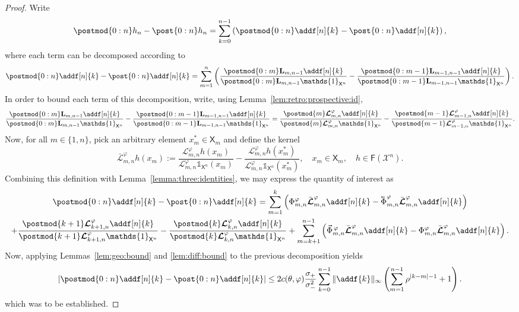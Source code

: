 \documentclass{article}
\newcommand{\retrokmodnorm}{\bar{\boldsymbol{\mathcal{L}}}^{\precpar}}
\newcommand{\xarb}{x^\ast}
\newcommand{\Xfd}{\mathcal{X}}
\newcommand{\cev}[1]{\reflectbox{\ensuremath{\vec{\reflectbox{\ensuremath{#1}}}}}}
\newcommand{\shiftbwd}{\cev{\shiftsymbol}^{\precpar}}
\newcommand{\shiftfwd}{\vec{\shiftsymbol}^{\, \precpar}}
\newcommand{\shiftsymbol}{\Phi}
\newcommand{\precpar}{\varphi}
\newcommand{\intvect}[2]{\{ #1, #2 \}}
\newcommand{\noshift}{\shiftsymbol^{\precpar}}
\newcommand{\udlow}{\sigma_-}
\newcommand{\udup}{\sigma_+}
\newcommand{\1}{\mathbbm{1}}
\newcommand{\retrokmod}{\boldsymbol{\mathcal{L}}^\precpar}
\newcommand{\uk}[1]{\mathbf{L}_{#1}}
\newcommand{\Xset}{\mathsf{X}}
\newcommand{\bmf}[1]{\set{F}(#1)}
\newcommand{\set}[1]{\mathsf{#1}}
\def\1{\mathds{1}}
\newcommand{\eqdef}{\ensuremath{:=}}
\begin{document}
\begin{proof}
Write 
$$
\postmod{0:n} h_n - \post{0:n} h_n = \sum_{k = 0}^{n - 1} \left( \postmod{0:n} \addf[n]{k} - \post{0:n} \addf[n]{k} \right), 
$$
where each term can be decomposed according to   
\begin{equation*}
\postmod{0:n} \addf[n]{k} - \post{0:n} \addf[n]{k} = 
\sum_{m = 1}^n \left( \frac{\postmod{0:m} \uk{m, n - 1} \addf[n]{k}}{\postmod{0:m} \uk{m, n - 1} \1_{\Xset^n}} - \frac{\postmod{0:m - 1} \uk{m - 1, n - 1} \addf[n]{k}}{\postmod{0:m - 1} \uk{m - 1, n - 1} \1_{\Xset^n}} \right).  
\end{equation*}
In order to bound each term of this decomposition, write, using Lemma~\ref{lem:retro:prospective:id},  
$$
\frac{\postmod{0:m} \uk{m, n - 1} \addf[n]{k}}{\postmod{0:m} \uk{m, n - 1} \1_{\Xset^n}} - \frac{\postmod{0:m - 1} \uk{m - 1, n - 1} \addf[n]{k}}{\postmod{0:m - 1} \uk{m - 1, n - 1} \1_{\Xset^n}} 
= \frac{\postmod{m} \retrokmod_{m, n} \addf[n]{k}}{\postmod{m} \retrokmod_{m, n} \1_{\Xset^n}} - \frac{\postmod{m - 1} \retrokmod_{m - 1, n} \addf[n]{k}}{\postmod{m - 1} \retrokmod_{m - 1, n} \1_{\Xset^n}}. 
$$
Now, for all $m \in \intvect{1}{n}$, pick an arbitrary element $\xarb_m \in \Xset_m$ and define the kernel 
\begin{equation} \label{eq:def:norm:objective:func}
\retrokmodnorm_{m, n} h(x_m) \eqdef \frac{\retrokmod_{m, n} h(x_m)}{\retrokmod_{m, n} \1_{\Xset^n}(x_m)} - \frac{\retrokmod_{m, n} h (\xarb_m)}{\retrokmod_{m, n} \1_{\Xset^n} (\xarb_m)}, \quad x_m \in \Xset_m, \quad h \in \bmf{\Xfd^n}. 
\end{equation}
Combining this definition with Lemma~\ref{lemma:three:identities}, we may express the quantity of interest as 
\begin{multline*}
\postmod{0:n} \addf[n]{k} - \post{0:n} \addf[n]{k} = \sum_{m = 1}^k \left( \noshift_{m, n} \retrokmodnorm_{m, n} \addf[n]{k} - \shiftbwd_{m, n}  \retrokmodnorm_{m, n} \addf[n]{k} \right) \\ 
+ \frac{\postmod{k + 1} \retrokmod_{k + 1, n} \addf[n]{k}}{\postmod{k + 1} \retrokmod_{k + 1, n} \1_{\Xset^n}} - \frac{\postmod{k} \retrokmod_{k, n} \addf[n]{k}}{\postmod{k} \retrokmod_{k, n} \1_{\Xset^n}} + \sum_{m = k + 1}^{n - 1} \left( \shiftfwd_{m, n} \retrokmodnorm_{m, n} \addf[n]{k} - \noshift_{m, n} \retrokmodnorm_{m, n} \addf[n]{k} \right). 
\end{multline*}
Now, applying Lemmas~\ref{lem:geo:bound} and \ref{lem:diff:bound} to the previous decomposition yields
$$
\left| \postmod{0:n} \addf[n]{k} - \post{0:n} \addf[n]{k} \right| \leq 2 c(\theta,\varphi) \frac{\udup }{\udlow^2} \sum_{k = 0}^{n - 1} \| \addf{k} \|_\infty \left( \sum_{m = 1}^{n - 1} \rho^{|k - m| - 1} + 1 \right).  
$$
which was to be established. 


\end{proof}
\end{document}
